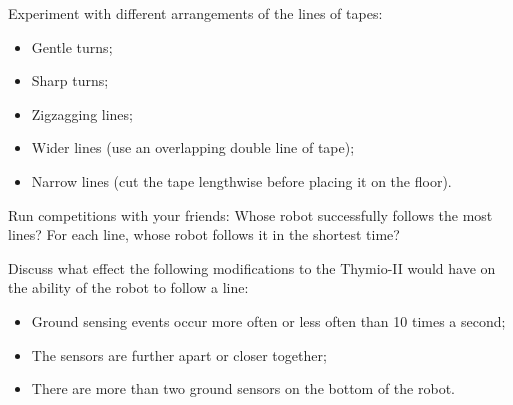
Experiment with different arrangements of the lines of tapes:
\begin{itemize}
\item Gentle turns;
\item Sharp turns;
\item Zigzagging lines;
\item Wider lines (use an overlapping double line of tape);
\item Narrow lines (cut the tape lengthwise before placing it on the floor).
\end{itemize}

Run competitions with your friends: Whose robot successfully follows the
most lines? For each line, whose robot follows it in the shortest time?


Discuss what effect the following modifications to the Thymio-II would
have on the ability of the robot to follow a line:

\begin{itemize}
\item Ground sensing events occur more often or less often than 10 times a second;
\item The sensors are further apart or closer together;
\item There are more than two ground sensors on the bottom of the robot.
\end{itemize}
